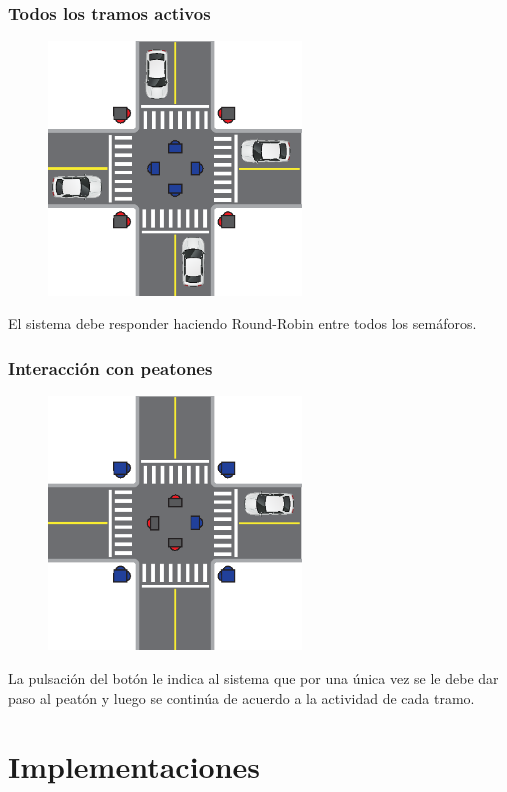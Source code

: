 \begin{frame}
\frametitle{Todos los tramos activos}
\begin{figure}[htbp]
	\centering
	\includegraphics[width=0.60\textwidth]{diagramas/todos-activos.eps}
\end{figure}
El sistema debe responder haciendo Round-Robin entre todos los semáforos.
\end{frame}

\begin{frame}
\frametitle{Interacción con peatones}
\begin{figure}[htbp]
	\centering
	\includegraphics[width=0.60\textwidth]{diagramas/peaton-auto.eps}
\end{figure}
La pulsación del botón le indica al sistema que por una única vez se le debe dar paso al peatón y luego se continúa de acuerdo a la actividad de cada tramo.
\end{frame}

\section{Implementaciones}

